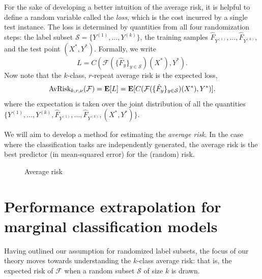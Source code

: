 \documentclass[12pt]{article}
\begin{document}
For the sake of developing a better intuition of the average risk, it
is helpful to define a random variable called the \emph{loss}, which
is the cost incurred by a single test instance.  The loss is
determined by quantities from all four randomization steps: the label
subset $\mathcal{S} = \{Y^{(1)},\hdots, Y^{(k)}\}$, the training samples
$\hat{F}_{Y^{(1)}},\hdots, \hat{F}_{Y^{(k)}}$, and the test point $(X^*, Y^*)$.
Formally, we write
\[
L = C(\mathcal{F}(\{\hat{F}_y\}_{y \in \mathcal{S}})(X^*), Y^*).
\]
Now note that the $k$-class, $r$-repeat average risk is the expected loss,
\begin{equation}\label{eq:avrisk_EL}
\text{AvRisk}_{k, r, \nu}(\mathcal{F}) = \textbf{E}[L] = \textbf{E}[C(\mathcal{F}(\{\hat{F}_y\}_{y \in \mathcal{S}})(X^*), Y^*)].
\end{equation}
where the expectation is taken over the joint distribution of all the
quantities $\{Y^{(1)},\hdots,
Y^{(k)}, \hat{F}_{Y^{(1)}},\hdots, \hat{F}_{Y^{(k)}}, (X^*, Y^*)\}$.

We will aim to develop a method for estimating the \emph{average
risk}.  In the case where the classification tasks are independently
generated, the average risk is the best predictor (in mean-squared
error) for the (random) risk.


\begin{figure}[h]
\centering
\caption{Average risk}\label{fig:average_risk}
\end{figure}




\section{Performance extrapolation for marginal classification models}

Having outlined our assumption for randomized label subsets, the focus
of our theory moves towards understanding the $k$-class average risk:
that is, the expected risk of $\mathcal{F}$ when a random subset
$\mathcal{S}$ of size $k$ is drawn.
\end{document}
